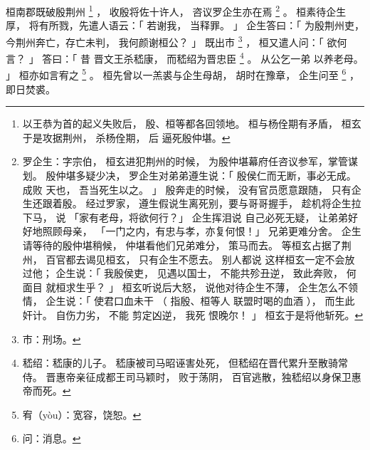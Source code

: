 
\switchcolumn*[\section{}]

桓南郡既破殷荆州%
\footnote{%
    以王恭为首的起义失败后，
    殷、桓等都各回领地。
    桓与杨佺期有矛盾，
    桓玄于是攻据荆州，
    杀杨佺期，
    后
    逼死殷仲堪。
}%
，
收殷将佐十许人，
咨议罗企生亦在焉%
\footnote{%
    罗企生：字宗伯，
            桓玄进犯荆州的时候，
            为殷仲堪幕府任咨议参军，掌管谋划。
            殷仲堪多疑少决，
            罗企生对弟弟遵生说：「
                殷侯仁而无断，事必无成。
                成败
                天也，
                吾当死生以之。
            」
            殷奔走的时候，
            没有官员愿意跟随，
            只有企生还跟着殷。
            经过罗家，
            遵生假说生离死别，要与哥哥握手，
            趁机将企生拉下马，
            说
            「家有老母，将欲何行？」
            企生挥泪说
            自己必死无疑，
            让弟弟好好地照顾母亲，
            「一门之内，有忠与孝，亦复何恨！」
            兄弟更难分舍。
            企生请等待的殷仲堪稍候，
            仲堪看他们兄弟难分，
            策马而去。
            等桓玄占据了荆州，
            百官都去谒见桓玄，
            只有企生不愿去。
            别人都说
            这样桓玄一定不会放过他；
            企生说：「
                我殷侯吏，
                见遇以国士，
                不能共殄丑逆，
                致此奔败，
                何面目
                就桓求生乎？
            」
            桓玄听说后大怒，
            说他对待企生不薄，
            企生怎么不领情，
            企生说：「
                使君口血未干
                （
                    指殷、桓等人
                    联盟时喝的血酒
                ），
                而生此奸计。
                自伤力劣，
                不能
                剪定凶逆，
                我死
                恨晚尔！
            」
            桓玄于是将他斩死。
}%
。
桓素待企生厚，
将有所戮，先遣人语云：「
    若谢我，
    当释罪。
」
企生答曰：「
    为殷荆州吏，
    今荆州奔亡，存亡未判，
    我何颜谢桓公？
」
既出市%
\footnote{%
    市：刑场。
}%
，
桓又遣人问：「
    欲何言？
」
答曰：「
    昔
    晋文王杀嵇康，
    而嵇绍为晋忠臣%
    \footnote{%
        嵇绍：嵇康的儿子。
              嵇康被司马昭诬害处死，
              但嵇绍在晋代累升至散骑常侍。
              晋惠帝亲征成都王司马颖时，
              败于荡阴，
              百官逃散，独嵇绍以身保卫惠帝而死。
    }%
    。
    从公乞一弟
    以养老母。
」
桓亦如言宥之%
\footnote{%
    宥（yòu）：宽容，饶恕。
}%
。
桓先曾以一羔裘与企生母胡，
胡时在豫章，
企生问至%
\footnote{%
    问：消息。
}%
，即日焚裘。

\switchcolumn



